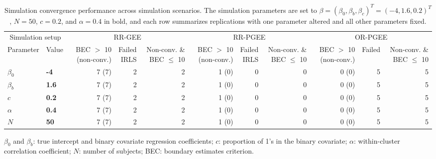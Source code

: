 \begin{table}[htbp]
\centering
\scriptsize
\setlength{\tabcolsep}{3pt}
\renewcommand{\arraystretch}{1.15}
\caption{Simulation convergence performance across simulation scenarios. The simulation parameters are set to $\beta = (\beta_0, \beta_b, \beta_c)^T = (-4, 1.6, 0.2)^T$, $N = 50$, $c = 0.2$, and $\alpha = 0.4$ in bold, and each row summarizes replications with one parameter altered and all other parameters fixed.}
\begin{tabular}{ll|rrr|rrr|rrr}
\hline
\multicolumn{2}{c|}{Simulation setup} & \multicolumn{3}{c|}{RR-GEE} & \multicolumn{3}{c|}{RR-PGEE} & \multicolumn{3}{c}{OR-PGEE} \\
Parameter & Value & \shortstack{BEC $>$ 10\\(non-conv.)} & \shortstack{Failed\\IRLS} & \shortstack{Non-conv.\\\& BEC $\leq$ 10} & \shortstack{BEC $>$ 10\\(non-conv.)} & \shortstack{Failed\\IRLS} & \shortstack{Non-conv.\\\& BEC $\leq$ 10} & \shortstack{BEC $>$ 10\\(non-conv.)} & Failed & \shortstack{Non-conv.\\\& BEC $\leq$ 10} \\
\hline
$\beta_0$ & \textbf{-4} & 7 (7) & 2 & 2 & 1 (0) & 0 & 0 & 0 (0) & 5 & 5 \\
\hline
$\beta_b$ & \textbf{1.6} & 7 (7) & 2 & 2 & 1 (0) & 0 & 0 & 0 (0) & 5 & 5 \\
\hline
$c$ & \textbf{0.2} & 7 (7) & 2 & 2 & 1 (0) & 0 & 0 & 0 (0) & 5 & 5 \\
\hline
$\alpha$ & \textbf{0.4} & 7 (7) & 2 & 2 & 1 (0) & 0 & 0 & 0 (0) & 5 & 5 \\
\hline
$N$ & \textbf{50} & 7 (7) & 2 & 2 & 1 (0) & 0 & 0 & 0 (0) & 5 & 5 \\
\hline
\end{tabular}
\begin{flushleft}
\footnotesize $\beta_0$ and $\beta_b$: true intercept and binary covariate regression coefficients; $c$: proportion of 1's in the binary covariate; $\alpha$: within-cluster correlation coefficient; $N$: number of subjects; BEC: boundary estimates criterion.
\end{flushleft}
\end{table}
